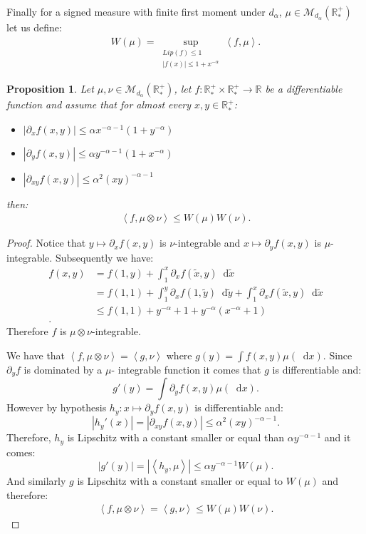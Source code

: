\documentclass[11pt,a4paper]{article}
\newcommand{\RR}{\mathbb{R}}
\newcommand{\RRP}{\mathbb{R}^+_*}
\newcommand{\MC}{\mathcal{M}}
\newcommand{\brac}[1]{\left\langle#1\right\rangle}
\newcommand{\dd}{\mathop{}\!\mathrm{d}}
\newtheorem{proposition}[theorem]{Proposition}
\begin{document}
Finally for a signed measure with finite first moment under $d_\alpha$, $\mu \in \MC_{d_\alpha}(\RRP)$ let us define:
\begin{align*}
    W(\mu) = \sup\limits_{\substack{Lip(f) \leq 1\\ |f(x)| \leq 1 + x^{-\alpha}}} \brac{f,\mu}.
\end{align*}
\begin{proposition}\label{prop:characterization-product}
    Let $\mu,\nu \in \MC_{d_\alpha}(\RRP)$, let $f : \RRP\times \RRP \to \RR$ be a differentiable function and assume that for almost every $x,y \in \RRP$:
    \begin{itemize}
        \item $\left|\partial_x f(x,y)\right| \leq \alpha  x^{-\alpha - 1}(1 + y^{-\alpha})$
        \item $\left|\partial_y f(x,y)\right| \leq \alpha y^{-\alpha - 1} (1 + x^{-\alpha})$
        \item $\left|\partial_{xy} f(x,y)\right| \leq \alpha^2 (xy)^{-\alpha - 1}$
    \end{itemize}
    then:
    \begin{align*}
        \brac{f,\mu\otimes \nu} \leq W(\mu)W(\nu).
    \end{align*}
\end{proposition}
\begin{proof}
    Notice that $y \mapsto \partial_x f(x,y)$ is $\nu$-integrable and $x \mapsto \partial_y f(x,y)$ is $\mu$-integrable. Subsequently we have:
    \begin{align*}
        f(x,y) &= f(1,y) + \int_1^x \partial_x f(\tilde{x},y) \dd \tilde{x}\\
        &= f(1,1) + \int_1^y \partial_x f(1,\tilde{y}) \dd \tilde{y} + \int_1^x \partial_x f(\tilde{x},y) \dd \tilde{x}\\
        &\leq f(1,1) + y^{-\alpha} + 1 + y^{-\alpha}(x^{-\alpha} + 1)\\.
    \end{align*}
    Therefore $f$ is $\mu\otimes \nu$-integrable.

    We have that $\brac{f,\mu\otimes \nu} = \brac{g,\nu}$ where $g(y) = \int f(x,y) \mu(\dd x)$. Since $\partial_y f$ is dominated by a $\mu$- integrable function it comes that $g$ is differentiable and:
    \[ g'(y) = \int \partial_y f(x,y) \mu(\dd x).\]
    However by hypothesis $h_y : x \mapsto \partial_y f(x,y)$ is differentiable and:
    \[
    |h_y'(x)| = \left|\partial_{xy} f(x,y)\right| \leq \alpha^2 (xy)^{-\alpha - 1}.
    \]
    Therefore, $h_y$ is Lipschitz with a constant smaller or equal than $\alpha y^{-\alpha - 1}$ and it comes:
    \[
    |g'(y)| = \left| \brac{h_y,\mu}\right| \leq \alpha y^{-\alpha - 1}W(\mu).
    \]
    And similarly $g$ is Lipschitz with a constant smaller or equal to $W(\mu)$ and therefore:
    \begin{align*}
        \brac{f,\mu\otimes\nu} = \brac{g,\nu} \leq W(\mu)W(\nu).
    \end{align*}
\end{proof}
\end{document}
